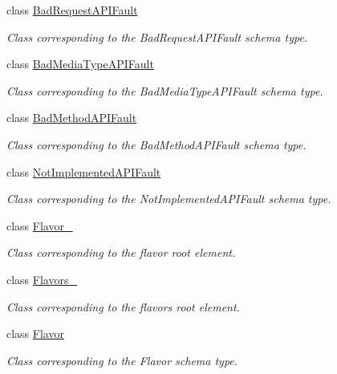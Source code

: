 \begin{DoxyCompactItemize}
class \hyperlink{classopenstack_1_1xml_1_1BadRequestAPIFault}{BadRequestAPIFault}
\begin{DoxyCompactList}\small\item\em Class corresponding to the BadRequestAPIFault schema type. \item\end{DoxyCompactList}\item 
class \hyperlink{classopenstack_1_1xml_1_1BadMediaTypeAPIFault}{BadMediaTypeAPIFault}
\begin{DoxyCompactList}\small\item\em Class corresponding to the BadMediaTypeAPIFault schema type. \item\end{DoxyCompactList}\item 
class \hyperlink{classopenstack_1_1xml_1_1BadMethodAPIFault}{BadMethodAPIFault}
\begin{DoxyCompactList}\small\item\em Class corresponding to the BadMethodAPIFault schema type. \item\end{DoxyCompactList}\item 
class \hyperlink{classopenstack_1_1xml_1_1NotImplementedAPIFault}{NotImplementedAPIFault}
\begin{DoxyCompactList}\small\item\em Class corresponding to the NotImplementedAPIFault schema type. \item\end{DoxyCompactList}\item 
class \hyperlink{classopenstack_1_1xml_1_1Flavor__}{Flavor\_\-}
\begin{DoxyCompactList}\small\item\em Class corresponding to the flavor root element. \item\end{DoxyCompactList}\item 
class \hyperlink{classopenstack_1_1xml_1_1Flavors__}{Flavors\_\-}
\begin{DoxyCompactList}\small\item\em Class corresponding to the flavors root element. \item\end{DoxyCompactList}\item 
class \hyperlink{classopenstack_1_1xml_1_1Flavor}{Flavor}
\begin{DoxyCompactList}\small\item\em Class corresponding to the Flavor schema type. \item\end{DoxyCompactList}\item 

\end{DoxyCompactItemize}
